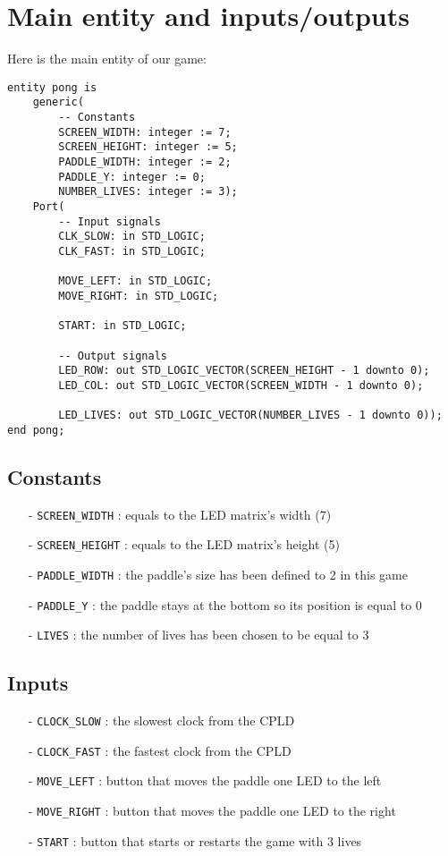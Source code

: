 \section{Main entity and inputs/outputs}

Here is the main entity of our game:

\begin{verbatim}
entity pong is
    generic(
        -- Constants
        SCREEN_WIDTH: integer := 7;
        SCREEN_HEIGHT: integer := 5;
        PADDLE_WIDTH: integer := 2;
        PADDLE_Y: integer := 0;
        NUMBER_LIVES: integer := 3);
    Port(
        -- Input signals
        CLK_SLOW: in STD_LOGIC;
        CLK_FAST: in STD_LOGIC;

        MOVE_LEFT: in STD_LOGIC;
        MOVE_RIGHT: in STD_LOGIC;

        START: in STD_LOGIC;

        -- Output signals
        LED_ROW: out STD_LOGIC_VECTOR(SCREEN_HEIGHT - 1 downto 0);
        LED_COL: out STD_LOGIC_VECTOR(SCREEN_WIDTH - 1 downto 0);
        
        LED_LIVES: out STD_LOGIC_VECTOR(NUMBER_LIVES - 1 downto 0));
end pong;
\end{verbatim}

\subsection{Constants}
\begin{itemize}
        \item[-] \texttt{SCREEN\_WIDTH} : equals to the LED matrix's width (7)
        
        \item[-] \texttt{SCREEN\_HEIGHT} : equals to the LED matrix's height (5)
        
        \item[-] \texttt{PADDLE\_WIDTH} : the paddle's size has been defined to 2 in this game
        
        \item[-] \texttt{PADDLE\_Y} : the paddle stays at the bottom so its position is equal to 0
        
        \item[-] \texttt{LIVES} : the number of lives has been chosen to be equal to 3
\end{itemize}
\subsection{Inputs}
\begin{itemize}
    \item[-] \texttt{CLOCK\_SLOW} : the slowest clock from the CPLD
    \item[-] \texttt{CLOCK\_FAST} : the fastest clock from the CPLD
    \item[-]\texttt{MOVE\_LEFT} : button that moves the paddle one LED to the left
    \item[-] \texttt{MOVE\_RIGHT} : button that moves the paddle one LED to the right
    \item[-] \texttt{START} : button that starts or restarts the game with 3 lives
\end{itemize}
